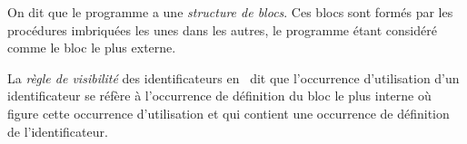 {\begin{minipage}{\myparboxwidth}
{\vspace{\neglskip}\mbox{}\par
\vspace{0.3\baselineskip}
\vspace{\neglskip}\mbox{}\par
\vspace{0.3\baselineskip}
\vspace{\neglskip}\mbox{}\par
\vspace{\neglskip}\mbox{\blc {}}\par
\vspace{\neglskip}\mbox{\blc \blk{}}\par
\vspace{\neglskip}\mbox{\blc \blk{}}\par
\vspace{\neglskip}\mbox{\blc \blk{}}\par
\vspace{\neglskip}\mbox{\blc {}}\par
\vspace{\neglskip}\mbox{\blc {}}\par
\vspace{\neglskip}\mbox{\blc {}}\par
\vspace{\neglskip}\mbox{\blc {}}\par
\vspace{0.3\baselineskip}
\vspace{\neglskip}\mbox{}\par
\vspace{\neglskip}\mbox{\blc {}}\par
\vspace{\neglskip}\mbox{\blc {}}\par
\vspace{\neglskip}\mbox{\blc {}}\par

\medskip }

On dit que le programme a une {\em structure de blocs}. Ces blocs sont formés par les procédures imbriquées 
 les unes dans les autres, le programme étant  considéré comme le bloc le plus externe. 
 
 La {\em règle de 
 visibilité} des identificateurs en \ocaml\ dit que l'occurrence d'utilisation d'un identificateur
 se réfère à l'occurrence de définition du bloc le plus interne où figure cette occurrence d'utilisation et
 qui contient une occurrence de définition de l'identificateur. 

\vspace{\abovedisplayskip}
\end{minipage}
}
